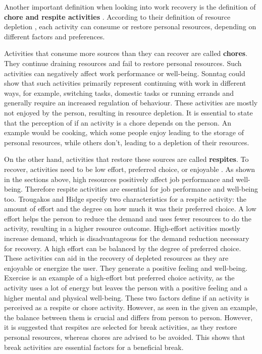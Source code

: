 \documentclass{hasel_thesis}
\begin{document}
Another important definition when looking into work recovery is the definition of \textbf{chore and respite activities} \cite{Trougakos.2009}. According to their definition of resource depletion \cite{BaumeisterR.F.BratslavskyE.MuravenM.&TiceD.M..1998}, each activity can consume or restore personal resources, depending on different factors and preferences. 

Activities that consume more sources than they can recover are called \textbf{chores}. They continue draining resources and fail to restore personal resources. Such activities can negatively affect work performance or well-being. Sonntag \cite{Sonnentag.2001} could show that such activities primarily represent continuing with work in different ways, for example, switching tasks, domestic tasks or running errands and generally require an increased regulation of behaviour. These activities are mostly not enjoyed by the person, resulting in resource depletion. It is essential to state that the perception of if an activity is a chore depends on the person. An example would be cooking, which some people enjoy leading to the storage of personal resources, while others don't, leading to a depletion of their resources.


On the other hand, activities that restore these sources are called \textbf{respites}. To recover, activities need to be low effort, preferred choice, or enjoyable \cite{Trougakos.2009}. As shown in the sections above, high resources positively affect job performance and well-being. Therefore respite activities are essential for job performance and well-being too. Trougakos and Hidge specify two characteristics for a respite activity: the amount of effort and the degree on how much it was their preferred choice. A low effort helps the person to reduce the demand and uses fewer resources to do the activity, resulting in a higher resource outcome. High-effort activities mostly increase demand, which is disadvantageous for the demand reduction necessary for recovery. A high effort can be balanced by the degree of preferred choice. These activities can aid in the recovery of depleted resources as they are enjoyable or energize the user. They generate a positive feeling and well-being. Exercise is an example of a high-effort but preferred choice activity, as the activity uses a lot of energy but leaves the person with a positive feeling and a higher mental and physical well-being. These two factors define if an activity is perceived as a respite or chore activity. However, as seen in the given an example, the balance between them is crucial and differs from person to person. However, it is suggested that respites are selected for break activities, as they restore personal resources, whereas chores are advised to be avoided. This shows that break activities are essential factors for a beneficial break.
\end{document}
